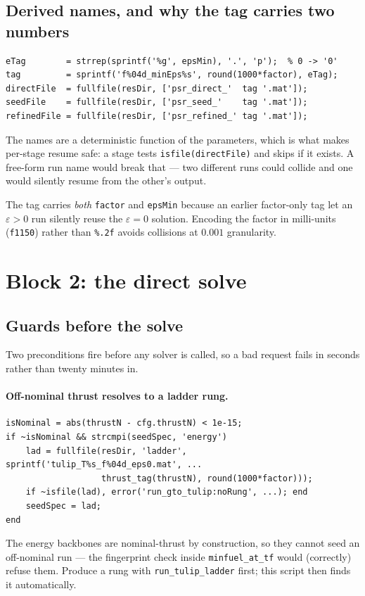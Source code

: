 \documentclass[11pt]{article}
\newcommand{\file}[1]{\texttt{#1}}
\begin{document}
\subsection{Derived names, and why the tag carries two numbers}

\begin{lstlisting}
eTag        = strrep(sprintf('%g', epsMin), '.', 'p');  % 0 -> '0'
tag         = sprintf('f%04d_minEps%s', round(1000*factor), eTag);
directFile  = fullfile(resDir, ['psr_direct_'  tag '.mat']);
seedFile    = fullfile(resDir, ['psr_seed_'    tag '.mat']);
refinedFile = fullfile(resDir, ['psr_refined_' tag '.mat']);
\end{lstlisting}

The names are a deterministic function of the parameters, which is what makes
per-stage resume safe: a stage tests \texttt{isfile(directFile)} and skips if it
exists. A free-form run name would break that --- two different runs could
collide and one would silently resume from the other's output.

The tag carries \emph{both} \texttt{factor} and \texttt{epsMin} because an
earlier factor-only tag let an $\varepsilon>0$ run silently reuse the
$\varepsilon=0$ solution. Encoding the factor in milli-units (\texttt{f1150})
rather than \texttt{\%.2f} avoids collisions at $0.001$ granularity.

\section{Block 2: the direct solve}

\subsection{Guards before the solve}
\label{sec:seedresolve}

Two preconditions fire before any solver is called, so a bad request fails in
seconds rather than twenty minutes in.

\paragraph{Off-nominal thrust resolves to a ladder rung.}
\begin{lstlisting}
isNominal = abs(thrustN - cfg.thrustN) < 1e-15;
if ~isNominal && strcmpi(seedSpec, 'energy')
    lad = fullfile(resDir, 'ladder', sprintf('tulip_T%s_f%04d_eps0.mat', ...
                   thrust_tag(thrustN), round(1000*factor)));
    if ~isfile(lad), error('run_gto_tulip:noRung', ...); end
    seedSpec = lad;
end
\end{lstlisting}
The energy backbones are nominal-thrust by construction, so they cannot seed an
off-nominal run --- the fingerprint check inside \file{minfuel\_at\_tf} would
(correctly) refuse them. Produce a rung with \file{run\_tulip\_ladder} first;
this script then finds it automatically.
\end{document}
